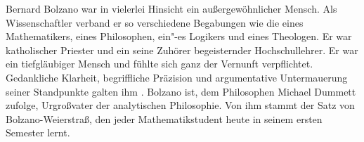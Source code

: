 \vspace{-1.5\baselineskip}
\noindent Bernard Bolzano war in vielerlei Hinsicht ein außergewöhnlicher Mensch. Als Wissenschaftler verband er so verschiedene Begabungen wie die eines Mathematikers, eines Philosophen, ein"-es Logikers und eines Theologen. Er war katholischer Priester und ein seine Zuhörer begeisternder Hochschullehrer. Er war ein tiefgläubiger Mensch und fühlte sich ganz der Vernunft verpflichtet.  Gedankliche Klarheit, begriffliche Präzision und argumentative Untermauerung seiner Standpunkte galten ihm .
Bolzano ist, dem Philosophen Michael Dummett zufolge, Urgroßvater der analytischen Philosophie.
Von ihm stammt der Satz von Bolzano-Weierstraß, den jeder Mathematikstudent heute in seinem ersten Semester 
lernt.\par

